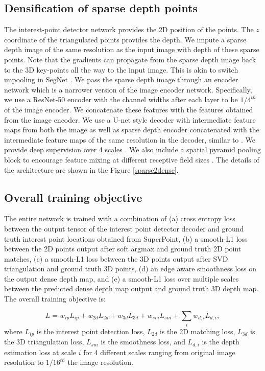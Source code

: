 \documentclass[runningheads]{llncs}
\begin{document}
\subsection{Densification of sparse depth points}
The interest-point detector network provides the 2D position of the points. The $z$ coordinate of the triangulated points provides the depth. We impute a sparse depth image of the same resolution as the input image with  depth of these sparse points. Note that the gradients can propagate from the sparse depth image back to the 3D key-points all the way to the input image. This is akin to switch unpooling in SegNet \cite{badrinarayanan2015segnet}. We pass the sparse depth image through an encoder network which is a narrower version of the image encoder network. Specifically, we use a ResNet-50 encoder with the channel widths after each layer to be $1/4^{th}$ of the image encoder. We concatenate these features with the features obtained from the image encoder. We use a U-net style decoder with intermediate feature maps from both the image as well as sparse depth encoder concatenated with the intermediate feature maps of the same resolution in the decoder, similar to  \cite{chen2018estimating}. We provide deep supervision over 4 scales \cite{lee2015deeply}. We also include a spatial pyramid pooling block to encourage feature mixing at different receptive field sizes \cite{he2015spatial,chen2017rethinking}. The details of the architecture are shown in the Figure \ref{sparse2dense}. 

\subsection{Overall training objective}
The entire network is trained with a combination of (a) cross entropy loss between the output tensor of the interest point detector decoder and ground truth interest point locations obtained from SuperPoint, (b) a smooth-L1 loss between the 2D points output after soft argmax and ground truth 2D point matches, (c) a smooth-L1 loss between the 3D points output after SVD triangulation and ground truth 3D points, (d) an edge aware smoothness loss on the output dense depth map, and (e) a smooth-L1 loss over multiple scales between the predicted dense depth map output and ground truth 3D depth map. The overall training objective is: 

\begin{equation}\label{advce2}
  L = w_{ip} L_{ip} + w_{2d} L_{2d} + w_{3d} L_{3d} + w_{sm} L_{sm} + \sum_i w_{d,i} L_{d,i}, 
\end{equation}
where $L_{ip}$ is the interest point detection loss, $L_{2d}$ is the 2D matching loss, $L_{3d}$ is the 3D triangulation loss, $L_{sm}$ is the smoothness loss, and $L_{d,i}$ is the depth estimation loss at scale $i$ for 4 different scales ranging from original image resolution to $1/16^{th}$ the image resolution. 
\end{document}
